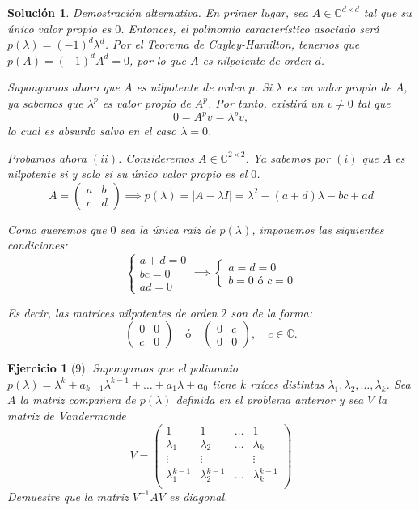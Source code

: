 \documentclass[11pt, a4paper]{article}
\newif\IfInSansMode
\numberwithin{equation}{section}
\theoremstyle{theorem-style}
\theoremstyle{definition-style}
\newtheorem{ejer}{Ejercicio}[section]
\theoremstyle{remark-style}
\newtheorem*{sol}{Solución}
\theoremstyle{example-style}
\begin{document}
\begin{sol}
    \textit{Demostración alternativa}. En primer lugar, sea $A \in \mathbb{C}^{d\times d}$ tal que su único valor propio es $0$. Entonces, el polinomio característico asociado será $p(\lambda) = (-1)^d\lambda^d$. Por el \textit{Teorema de Cayley-Hamilton}, tenemos que $p(A) = (-1)^dA^d = 0$, por lo que $A$ es nilpotente de orden $d$.

    Supongamos ahora que $A$ es nilpotente de orden $p$. Si $\lambda$ es un valor propio de $A$, ya sabemos que $\lambda^p$ es valor propio de $A^p$. Por tanto, existirá un $v \neq 0$ tal que $$ 0 = A^p v =  \lambda^p v,$$ lo cual es absurdo salvo en el caso $\lambda = 0$.

    \underline{Probamos ahora $(ii)$}. Consideremos $A \in \mathbb{C}^{2\times 2}$. Ya sabemos por $(i)$ que $A$ es nilpotente si y solo si su único valor propio es el $0$. $$A = \begin{pmatrix}
        a & b\\
        c & d
    \end{pmatrix} \implies p(\lambda) = |A - \lambda I| = \lambda^2 - (a+d)\lambda - bc + ad$$

    Como queremos que $0$ sea la única raíz de $p(\lambda)$, imponemos las siguientes condiciones: $$\begin{cases}
        a + d = 0\\
        bc = 0\\
        ad = 0
    \end{cases} \implies 
    \begin{cases}
        a = d = 0\\
        b = 0 \text{ ó } c = 0
    \end{cases}$$

    Es decir, las matrices nilpotentes de orden $2$ son de la forma: $$\begin{pmatrix}
        0 & 0\\
        c & 0	
    \end{pmatrix} \quad \text{ó} \quad 
    \begin{pmatrix}
        0 & c\\
        0 & 0	    
    \end{pmatrix}, \quad c \in \mathbb{C}.$$
\end{sol}

\begin{ejer}[9]
    Supongamos que el polinomio $p(\lambda) = \lambda^k + a_{k-1}\lambda^{k-1} + \hdots + a_1\lambda + a_0$ tiene $k$ raíces distintas $\lambda_1, \lambda_2, \hdots, \lambda_k$. Sea $A$ la matriz \textit{compañera} de $p(\lambda)$ definida en el problema anterior y sea $V$ la matriz de \textit{Vandermonde} $$V = \begin{pmatrix}
        1 & 1 & \hdots & 1 \\
        \lambda_1 & \lambda_2 & \hdots & \lambda_k \\
        \vdots & \vdots & & \vdots \\
        \lambda_1^{k-1} & \lambda_2^{k-1} & \hdots & \lambda_k^{k-1} \\
    \end{pmatrix}$$
    Demuestre que la matriz $V^{-1}AV$ es diagonal.
\end{ejer}
\end{document}
